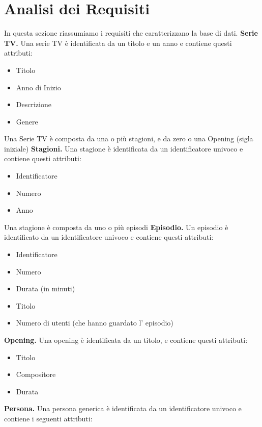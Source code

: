 \documentclass[12pt,a4paper]{article}
\begin{document}
\section{Analisi dei Requisiti}
In questa sezione riassumiamo i requisiti che caratterizzano la base di dati.\newline\newline
\textbf{Serie TV.} Una serie TV è identificata da un titolo e un anno e contiene questi attributi:
\begin{itemize}
  \item Titolo
  \item Anno di Inizio
  \item Descrizione
  \item Genere
\end{itemize}
Una Serie TV è composta da una o più stagioni, e da zero o una Opening (sigla iniziale) \newline\newline\newline\newline
\textbf{Stagioni.} Una stagione è identificata da un identificatore univoco e contiene questi attributi:
\begin{itemize}
    \item Identificatore
    \item Numero
    \item Anno
\end{itemize}
Una stagione è composta da uno o più episodi\newline\newline
\textbf{Episodio.} Un episodio è identificato da un identificatore univoco e contiene questi attributi:
\begin{itemize}
    \item Identificatore
    \item Numero
    \item Durata (in minuti)
    \item Titolo
    \item Numero di utenti (che hanno guardato l' episodio)
\end{itemize}
\textbf{Opening.} Una opening è identificata da un titolo, e contiene questi attributi:
\begin{itemize}
    \item Titolo
    \item Compositore
    \item Durata
\end{itemize}
\textbf{Persona.} Una persona generica è identificata da un identificatore univoco e contiene i seguenti attributi: 
\end{document}
